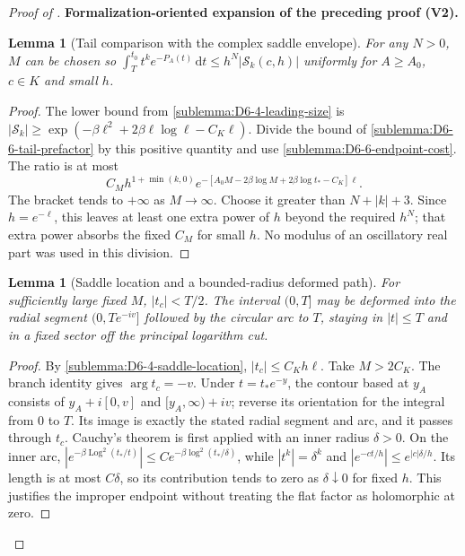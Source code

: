 \documentclass[11pt]{article}
\newtheorem{lemma}[theorem]{Lemma}
\newcommand{\formalisationparentid}{X}
\newenvironment{formalisationaddition}[1]{\par\medskip\begingroup\color{blue}\def\formalisationparentid{#1}\setcounter{formalizationsublemma}{0}\let\lemma\formalizationsublemma\let\endlemma\endformalizationsublemma
  \def\Eo{\mathcal E_h^\circ}\def\EE{\mathcal E_h}\def\phio{\phi_h^\circ}\def\phih{\phi_h}\def\Ho{H_h^{\rm atom}(v^\circ)}\def\Ha{H_h^{\rm atom}}\def\HL{H_h^{L}}\def\Dh{D_h}\def\Log{\operatorname{Log}}\def\ellh{\ell_h}\def\Gp{G_{p,h}}\def\Ast{A_{*,h}}\def\ahat{\widehat{\mathfrak a}_h}\def\ah{\mathfrak a_h}\def\rh{\widehat\rho_h}\def\deltah{\widehat\delta_h}\def\oldref##1{\textup{(##1)}}\def\interface##1{\par\noindent\textit{Analytical interface used here.} ##1\par}\def\finish{\par\noindent\textit{Conclusion of the formalization-oriented expansion.} }\par\noindent\textbf{Formalization-oriented expansion of the preceding proof (V2).}\par\smallskip
}{\par\endgroup\medskip
}
\begin{document}
\begin{proof}[Proof of ]
\begin{formalisationaddition}{D-L6.6}
\begin{lemma}[Tail comparison with the complex saddle envelope]\label{sublemma:D6-6-tail}
For any $N>0$, $M$ can be chosen so
$\int_T^{t_0}t^ke^{-P_A(t)}\,\mathrm dt\le h^N|\mathcal S_k(c,h)|$
uniformly for $A\ge A_0$, $c\in K$ and small $h$.
\end{lemma}
\begin{proof}
The lower bound from \ref{sublemma:D6-4-leading-size} is
$|\mathcal S_k|\ge\exp(-\beta\ell^2+2\beta\ell\log\ell-C_K\ell)$.
Divide the bound of \ref{sublemma:D6-6-tail-prefactor} by this positive
quantity and use \ref{sublemma:D6-6-endpoint-cost}. The ratio is at most
\[
 C_Mh^{1+\min(k,0)}
 e^{-[A_0M-2\beta\log M+2\beta\log t_*-C_K]\ell}.
\]
The bracket tends to $+\infty$ as $M\to\infty$.
Choose it greater than $N+|k|+3$. Since $h=e^{-\ell}$, this leaves
at least one extra power of $h$ beyond the required $h^N$;
that extra power absorbs the fixed $C_M$ for small $h$.
No modulus of an oscillatory real part was used in this division.
\end{proof}

\begin{lemma}[Saddle location and a bounded-radius deformed path]\label{sublemma:D6-6-contour-location}
For sufficiently large fixed $M$, $|t_c|<T/2$.
The interval $(0,T]$ may be deformed into the radial segment
$(0,Te^{-iv}]$ followed by the circular arc to $T$, staying in $|t|\le T$
and in a fixed sector off the principal logarithm cut.
\end{lemma}
\begin{proof}
By \ref{sublemma:D6-4-saddle-location}, $|t_c|\le C_Kh\ell$.
Take $M>2C_K$. The branch identity gives $\arg t_c=-v$.
Under $t=t_*e^{-y}$, the contour based at $y_A$ consists of
$y_A+i[0,v]$ and $[y_A,\infty)+iv$; reverse its orientation for the
integral from $0$ to $T$. Its image is exactly the stated radial
segment and arc, and it passes through $t_c$.
Cauchy's theorem is first applied with an inner radius $\delta>0$.
On the inner arc,
$|e^{-\beta\Log^2(t_*/t)}|
 \le C e^{-\beta\log^2(t_*/\delta)}$,
while $|t^k|=\delta^k$ and $|e^{-ct/h}|\le e^{|c|\delta/h}$.
Its length is at most $C\delta$, so its contribution tends to zero
as $\delta\downarrow0$ for fixed $h$. This justifies the improper
endpoint without treating the flat factor as holomorphic at zero.
\end{proof}


\end{formalisationaddition}
\end{proof}
\end{document}
